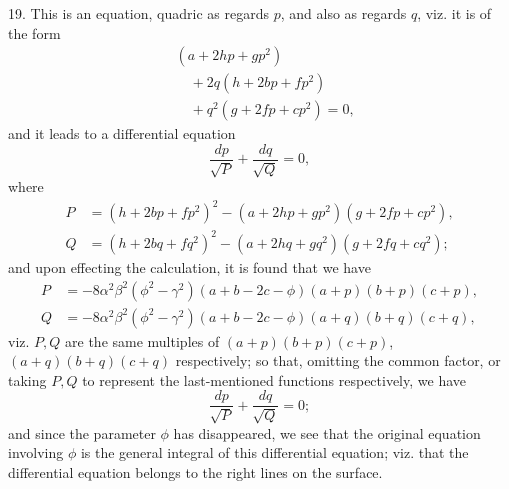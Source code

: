 \documentclass[11pt,a4paper]{article}
\begin{document}
19. This is an equation, quadric as regards $p$, and also as regards $q$, viz. it is
of the form
\[
\begin{aligned}
 &(a+2hp+gp^2)\\
 &\quad+2q(h+2bp+fp^2)\\
 &\quad+q^2(g+2fp+cp^2)=0,
\end{aligned}
\]
and it leads to a differential equation
\[
 \frac{dp}{\sqrt P}+\frac{dq}{\sqrt Q}=0,
\]
where
\[
\begin{aligned}
 P&=(h+2bp+fp^2)^2-(a+2hp+gp^2)(g+2fp+cp^2),\\
 Q&=(h+2bq+fq^2)^2-(a+2hq+gq^2)(g+2fq+cq^2);
\end{aligned}
\]
and upon effecting the calculation, it is found that we have
\[
\begin{aligned}
 P&=-8\alpha^2\beta^2(\phi^2-\gamma^2)(a+b-2c-\phi)(a+p)(b+p)(c+p),\\
 Q&=-8\alpha^2\beta^2(\phi^2-\gamma^2)(a+b-2c-\phi)(a+q)(b+q)(c+q),
\end{aligned}
\]
viz. $P,Q$ are the same multiples of $(a+p)(b+p)(c+p)$,
$(a+q)(b+q)(c+q)$ respectively; so that, omitting the common factor, or taking
$P,Q$ to represent the last-mentioned functions respectively, we have
\[
 \frac{dp}{\sqrt P}+\frac{dq}{\sqrt Q}=0;
\]
and since the parameter $\phi$ has disappeared, we see that the original equation involving
$\phi$ is the general integral of this differential equation; viz. that the differential
equation belongs to the right lines on the surface.
\end{document}
